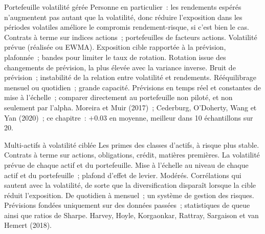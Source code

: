 \begin{strategyfile}{Portefeuille volatilité gérée}\label{strat:s1:volatility-targeting-and-risk-managed-portfolios:equity}
 Personne en particulier~: les rendements espérés n'augmentent pas autant que la volatilité, donc réduire l'exposition dans les périodes volatiles améliore le
compromis rendement-risque, si c'est bien le cas.
 Contrats à terme sur indices actions~; portefeuilles de facteurs actions.
 Volatilité prévue (réalisée ou EWMA).
 Exposition cible rapportée à la prévision, plafonnée~; bandes pour limiter le taux de rotation.
 Rotation issue des changements de prévision, la plus élevée avec la variance inverse.
 Bruit de prévision~; instabilité de la relation entre volatilité et rendements.
 Rééquilibrage mensuel ou quotidien~; grande capacité.
 Prévisions en temps réel et constantes de mise à l'échelle~; comparer directement au portefeuille non piloté, et non seulement par l'alpha.
 Moreira et Muir (2017)~; Cederburg, O'Doherty, Wang et Yan (2020)~; ce chapitre~: $+0.03$ en moyenne, meilleur dans 10 échantillons sur 20.
\end{strategyfile}

\begin{strategyfile}{Multi-actifs à volatilité ciblée}\label{strat:s1:volatility-targeting-and-risk-managed-portfolios:multi}
 Les primes des classes d'actifs, à risque plus stable.
 Contrats à terme sur actions, obligations, crédit, matières premières.
 La volatilité prévue de chaque actif et du portefeuille.
 Mise à l'échelle au niveau de chaque actif et du portefeuille~; plafond d'effet de levier.
 Modérés.
 Corrélations qui sautent avec la volatilité, de sorte que la diversification disparaît lorsque la cible réduit l'exposition.
 De quotidien à mensuel~; un système de gestion des risques.
 Prévisions fondées uniquement sur des données passées~; statistiques de queue ainsi que ratios de Sharpe.
 Harvey, Hoyle, Korgaonkar, Rattray, Sargaison et van Hemert (2018).
\end{strategyfile}


